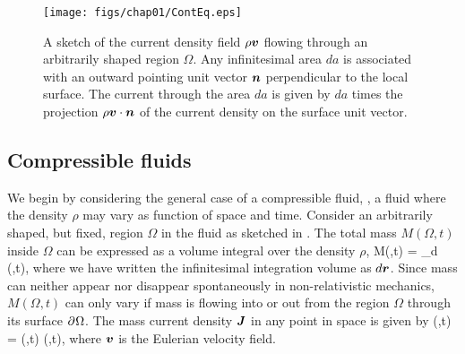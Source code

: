 \begin{figure}
\centerline{
  \texttt{[image: figs/chap01/ContEq.eps]}}
\caption[Continuity equation]{ A sketch of the
current density field $\rho \bm{v}$ flowing through an arbitrarily
shaped region $\Omega$. Any infinitesimal area $da$ is associated
with an outward pointing unit vector $\bm{n}$ perpendicular to the
local surface. The current through the area $da$ is given by $da$
times the projection $\rho\bm{v}\cdot\bm{n}$ of the current density on
the surface unit vector.}
\end{figure}


\subsection{Compressible fluids}

We begin by considering the general case of a compressible fluid,
\ie, a fluid where the density $\rho$ may vary as function of
space and time. Consider an arbitrarily shaped, but fixed, region
$\Omega$ in the fluid as sketched in . The total
mass $M(\Omega,t)$ inside $\Omega$ can be expressed as a volume
integral over the density $\rho$,
%
 M(\Omega,t) = \int_\Omega d\rrr\: \rho(\rrr,t),
 \eeq
%
where we have written the infinitesimal integration volume as
$d\bm{r}$. Since mass can neither appear nor disappear spontaneously
in non-relativistic mechanics, $M(\Omega,t)$ can only vary if mass
is flowing into or out from the region $\Omega$ through its
surface $\partial^{{}} \Omega$. The mass current density $\bm{J}$ in any point
in space is given by
%
 \JJJ(\rrr,t) = \rho(\rrr,t)\: \vvv(\rrr,t),
 \eeq
%
where $\bm{v}$ is the Eulerian velocity field.

